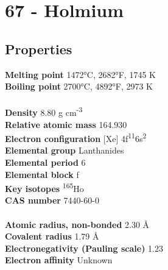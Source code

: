 \section{67 - Holmium}
\label{sec:elem-holmium}
\subsection{Properties}
\textbf{Melting point} 1472°C, 2682°F, 1745 K\\
\textbf{Boiling point} 2700°C, 4892°F, 2973 K\\
\\
\textbf{Density} 8.80 g cm\textsuperscript{-3}\\
\textbf{Relative atomic mass} 164.930\\
\textbf{Electron configuration} [Xe] 4f\textsuperscript{11}6s\textsuperscript{2}\\
\textbf{Elemental group} Lanthanides\\
\textbf{Elemental period} 6\\
\textbf{Elemental block} f\\
\textbf{Key isotopes} \textsuperscript{165}Ho\\
\textbf{CAS number} 7440-60-0\\
\\
\textbf{Atomic radius, non-bonded} 2.30 Å\\
\textbf{Covalent radius} 1.79 Å\\
\textbf{Electronegativity (Pauling scale)} 1.23\\
\textbf{Electron affinity} Unknown\\